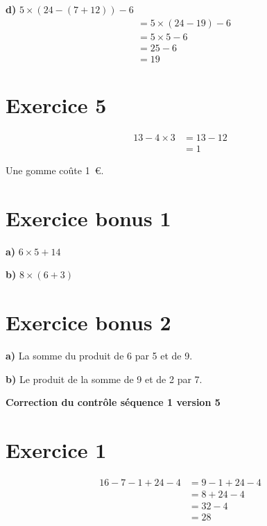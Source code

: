 \documentclass[12pt]{extarticle}
\begin{document}
\textbf{d)} $5 \times (24 - (7 + 12)) - 6$
\begin{align*}
&= 5 \times (24 - 19) - 6 \\
&= 5 \times 5 - 6 \\
&= 25 - 6 \\
&= 19
\end{align*}

\section*{Exercice 5}
\begin{align*}
13 - 4 \times 3 &= 13 - 12 \\
                &= 1
\end{align*}

Une gomme coûte 1~€.

\section*{Exercice bonus 1}

\textbf{a)} $6 \times 5 + 14$

\textbf{b)} $8 \times (6 + 3)$

\section*{Exercice bonus 2}

\textbf{a)} La somme du produit de 6 par 5 et de 9.

\textbf{b)} Le produit de la somme de 9 et de 2 par 7.

\newpage

\begin{center}
\Large\textbf{Correction du contrôle séquence 1 version 5}
\end{center}

\section*{Exercice 1}
\begin{align*}
16 - 7 - 1 + 24 - 4 &= 9 - 1 + 24 - 4 \\
                     &= 8 + 24 - 4 \\
                     &= 32 - 4 \\
                     &= 28
\end{align*}
\end{document}
